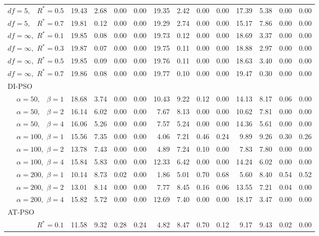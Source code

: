 \documentclass[12pt]{article}
\begin{document}
\begin{table}[ht]
{\begin{tabular}{r|rrrr|rrrr|rrrr}
  $df = 5,\enspace$ $R^* =0.5$ & 19.43 & 2.68 & 0.00 & 0.00 & 19.35 & 2.42 & 0.00 & 0.00 & 17.39 & 5.38 & 0.00 & 0.00 \\ 
  $df = 5,\enspace$ $R^* =0.7$ & 19.81 & 0.12 & 0.00 & 0.00 & 19.29 & 2.74 & 0.00 & 0.00 & 15.17 & 7.86 & 0.00 & 0.00 \\ 
  $df = \infty,$ $R^* =0.1$ & 19.85 & 0.08 & 0.00 & 0.00 & 19.73 & 0.12 & 0.00 & 0.00 & 18.69 & 3.37 & 0.00 & 0.00 \\ 
  $df = \infty,$ $R^* =0.3$ & 19.87 & 0.07 & 0.00 & 0.00 & 19.75 & 0.11 & 0.00 & 0.00 & 18.88 & 2.97 & 0.00 & 0.00 \\ 
  $df = \infty,$ $R^* =0.5$ & 19.85 & 0.09 & 0.00 & 0.00 & 19.76 & 0.11 & 0.00 & 0.00 & 18.63 & 3.40 & 0.00 & 0.00 \\ 
  $df = \infty,$ $R^* =0.7$ & 19.86 & 0.08 & 0.00 & 0.00 & 19.77 & 0.10 & 0.00 & 0.00 & 19.47 & 0.30 & 0.00 & 0.00 \\ 
\hline
\multicolumn{1}{l|}{DI-PSO} &&&&&&&&&&&&\\
  $\alpha = 50,\enspace$ $\beta =1$ & 18.68 & 3.74 & 0.00 & 0.00 & 10.43 & 9.22 & 0.12 & 0.00 & 14.13 & 8.17 & 0.06 & 0.00 \\ 
  $\alpha = 50,\enspace$ $\beta =2$ & 16.14 & 6.02 & 0.00 & 0.00 & 7.67 & 8.13 & 0.00 & 0.00 & 10.62 & 7.81 & 0.00 & 0.00 \\ 
  $\alpha = 50,\enspace$ $\beta =4$ & 16.06 & 5.26 & 0.00 & 0.00 & 7.57 & 5.24 & 0.00 & 0.00 & 14.36 & 5.61 & 0.00 & 0.00 \\ 
  $\alpha = 100,$ $\beta =1$ & 15.56 & 7.35 & 0.00 & 0.00 & 4.06 & 7.21 & 0.46 & 0.24 & 9.89 & 9.26 & 0.30 & 0.26 \\ 
  $\alpha = 100,$ $\beta =2$ & 13.78 & 7.43 & 0.00 & 0.00 & 4.89 & 7.24 & 0.10 & 0.00 & 7.83 & 7.80 & 0.00 & 0.00 \\ 
  $\alpha = 100,$ $\beta =4$ & 15.84 & 5.83 & 0.00 & 0.00 & 12.33 & 6.42 & 0.00 & 0.00 & 14.24 & 6.02 & 0.00 & 0.00 \\ 
  $\alpha = 200,$ $\beta =1$ & 10.14 & 8.73 & 0.02 & 0.00 & 1.86 & 5.01 & 0.70 & 0.68 & 5.60 & 8.40 & 0.54 & 0.52 \\ 
  $\alpha = 200,$ $\beta =2$ & 13.01 & 8.14 & 0.00 & 0.00 & 7.77 & 8.45 & 0.16 & 0.06 & 13.55 & 7.21 & 0.04 & 0.00 \\ 
  $\alpha = 200,$ $\beta =4$ & 15.82 & 5.72 & 0.00 & 0.00 & 12.69 & 7.40 & 0.00 & 0.00 & 18.17 & 3.47 & 0.00 & 0.00 \\ 
\hline
\multicolumn{1}{l|}{AT-PSO} &&&&&&&&&&&&\\
  $R^* = 0.1$ & 11.58 & 9.32 & 0.28 & 0.24 & 4.82 & 8.47 & 0.70 & 0.12 & 9.17 & 9.43 & 0.02 & 0.00 \\ 

\end{tabular}}
\end{table}
\end{document}
